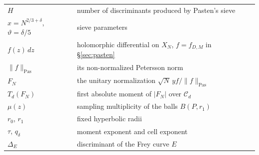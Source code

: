 \documentclass[11pt,reqno]{amsart}
\theoremstyle{definition}
\begin{document}
{\begin{tabular}{@{}ll@{}}
$H$ & number of discriminants produced by Pasten's sieve\\
$x=N^{2/3+\delta}$, $\vartheta=\delta/5$ & sieve parameters\\
$f(z)\,dz$ & holomorphic differential on $X_N$, $f=f_{D,M}$
in \S\ref{sec:pasten}\\
$\|f\|_{\mathrm{Pas}}$ & its non-normalized Petersson norm\\
$F_N$ & the unitary normalization $\sqrt N\,yf/\|f\|_{\mathrm{Pas}}$\\
$T_d(F_N)$ & first absolute moment of $|F_N|$ over $\mathscr C_d$\\
$\mu(z)$ & sampling multiplicity of the balls $B(P,r_1)$\\
$r_0$, $r_1$ & fixed hyperbolic radii\\
$\tau$, $q_\delta$ & moment exponent and cell exponent\\
$\Delta_E$ & discriminant of the Frey curve $E$\\
\end{tabular}}



\end{document}
